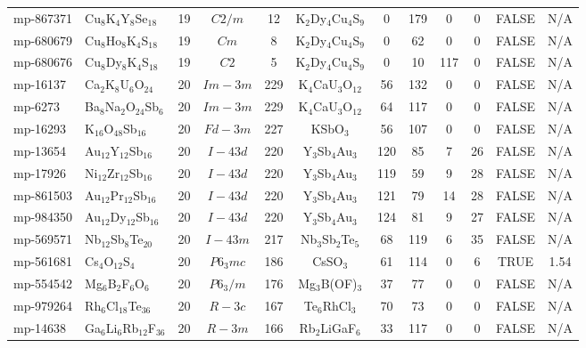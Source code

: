 {\begin{longtable}{llcccccccccc}
    mp-867371 & Cu$_{8}$K$_{4}$Y$_{8}$Se$_{18}$ & 19    & $C2/m$ & 12    & K$_{2}$Dy$_{4}$Cu$_{4}$S$_{9}$ & 0     & 179   & 0     & 0     & FALSE & N/A \\
    mp-680679 & Cu$_{8}$Ho$_{8}$K$_{4}$S$_{18}$ & 19    & $Cm$  & 8     & K$_{2}$Dy$_{4}$Cu$_{4}$S$_{9}$ & 0     & 62    & 0     & 0     & FALSE & N/A \\
    mp-680676 & Cu$_{8}$Dy$_{8}$K$_{4}$S$_{18}$ & 19    & $C2$  & 5     & K$_{2}$Dy$_{4}$Cu$_{4}$S$_{9}$ & 0     & 10    & 117   & 0     & FALSE & N/A \\
    mp-16137 & Ca$_{2}$K$_{8}$U$_{6}$O$_{24}$ & 20    & $Im-3m$ & 229   & K$_{4}$CaU$_{3}$O$_{12}$ & 56    & 132   & 0     & 0     & FALSE & N/A \\
    mp-6273 & Ba$_{8}$Na$_{2}$O$_{24}$Sb$_{6}$ & 20    & $Im-3m$ & 229   & K$_{4}$CaU$_{3}$O$_{12}$ & 64    & 117   & 0     & 0     & FALSE & N/A \\
    mp-16293 & K$_{16}$O$_{48}$Sb$_{16}$ & 20    & $Fd-3m$ & 227   & KSbO$_{3}$ & 56    & 107   & 0     & 0     & FALSE & N/A \\
    mp-13654 & Au$_{12}$Y$_{12}$Sb$_{16}$ & 20    & $I-43d$ & 220   & Y$_{3}$Sb$_{4}$Au$_{3}$ & 120   & 85    & 7     & 26    & FALSE & N/A \\
    mp-17926 & Ni$_{12}$Zr$_{12}$Sb$_{16}$ & 20    & $I-43d$ & 220   & Y$_{3}$Sb$_{4}$Au$_{3}$ & 119   & 59    & 9     & 28    & FALSE & N/A \\
    mp-861503 & Au$_{12}$Pr$_{12}$Sb$_{16}$ & 20    & $I-43d$ & 220   & Y$_{3}$Sb$_{4}$Au$_{3}$ & 121   & 79    & 14    & 28    & FALSE & N/A \\
    mp-984350 & Au$_{12}$Dy$_{12}$Sb$_{16}$ & 20    & $I-43d$ & 220   & Y$_{3}$Sb$_{4}$Au$_{3}$ & 124   & 81    & 9     & 27    & FALSE & N/A \\
    mp-569571 & Nb$_{12}$Sb$_{8}$Te$_{20}$ & 20    & $I-43m$ & 217   & Nb$_{3}$Sb$_{2}$Te$_{5}$ & 68    & 119   & 6     & 35    & FALSE & N/A \\
    mp-561681 & Cs$_{4}$O$_{12}$S$_{4}$ & 20    & $P6_3mc$ & 186   & CsSO$_{3}$ & 61    & 114   & 0     & 6     & TRUE  & 1.54  \\
    mp-554542 & Mg$_{6}$B$_{2}$F$_{6}$O$_{6}$ & 20    & $P6_3/m$ & 176   & Mg$_{3}$B(OF)$_{3}$ & 37    & 77    & 0     & 0     & FALSE & N/A \\
    mp-979264 & Rh$_{6}$Cl$_{18}$Te$_{36}$ & 20    & $R-3c$ & 167   & Te$_{6}$RhCl$_{3}$ & 70    & 73    & 0     & 0     & FALSE & N/A \\
    mp-14638 & Ga$_{6}$Li$_{6}$Rb$_{12}$F$_{36}$ & 20    & $R-3m$ & 166   & Rb$_{2}$LiGaF$_{6}$ & 33    & 117   & 0     & 0     & FALSE & N/A \\

\end{longtable}}

